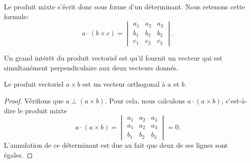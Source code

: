 Le produit mixte s'écrit donc sous forme d'un déterminant. Nous retenons cette formule:
\begin{equation}        \label{EqProduitMixteDet}
    a\cdot (b\times c)=\begin{vmatrix}
        a_1    &   a_2    &   a_3    \\
        b_1    &   b_2    &   b_3    \\
        c_1    &   c_2    &   c_3
    \end{vmatrix}.
\end{equation}

Un grand intérêt du produit vectoriel est qu'il fournit un vecteur qui est simultanément perpendiculaire aux deux vecteurs donnés.
\begin{proposition}     \label{PROPooTUVKooOQXKKl}
    Le produit vectoriel $a\times b$ est un vecteur orthogonal à $a$ et $b$.
\end{proposition}

\begin{proof}
    Vérifions que $a\perp (a\times b)$. Pour cela, nous calculons $a\cdot (a\times b)$, c'est-à-dire le produit mixte
    \begin{equation}
        a\cdot(a\times b)=\begin{vmatrix}
            a_1    &   a_2    &   a_3    \\
            a_1    &   a_2    &   a_3    \\
            b_1    &   b_2    &   b_3
        \end{vmatrix}=0.
    \end{equation}
    L'annulation de ce déterminant est due au fait que deux de ses lignes sont égales.
\end{proof}

